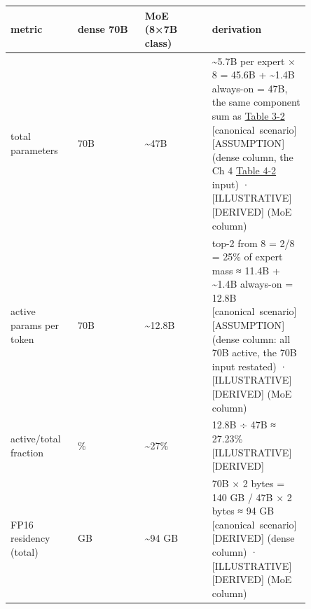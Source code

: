 \nopagebreak[4]
\begin{longtable}[]{@{}
  >{\raggedright\arraybackslash}p{0.2127\linewidth}
  >{\raggedright\arraybackslash}p{0.2127\linewidth}
  >{\raggedright\arraybackslash}p{0.2127\linewidth}
  >{\raggedright\arraybackslash}p{0.2127\linewidth}@{}}
\toprule\noalign{}
\begin{minipage}[b]{\linewidth}\raggedright
metric
\end{minipage} & \begin{minipage}[b]{\linewidth}\raggedright
dense 70B
\end{minipage} & \begin{minipage}[b]{\linewidth}\raggedright
MoE (8×7B class)
\end{minipage} & \begin{minipage}[b]{\linewidth}\raggedright
derivation
\end{minipage} \\
\midrule\noalign{}
\endhead
\bottomrule\noalign{}
\endlastfoot
total parameters & 70B & \textasciitilde47B & \textasciitilde5.7B per
expert × 8 = 45.6B + \textasciitilde1.4B always-on = 47B, the same
component sum as \hyperref[tab:3.2]{Table 3-2} \mbox{{[}canonical scenario{]}}\hspace{0pt}\mbox{{[}ASSUMPTION{]}}
(dense column, the Ch 4 \hyperref[tab:4.2]{Table 4-2} input) ·
\mbox{{[}ILLUSTRATIVE{]}}\hspace{0pt}\mbox{{[}DERIVED{]}} (MoE column) \\
\noalign{\label{tab:3.3}}
active params per token & 70B & \textasciitilde12.8B & top-2 from 8 =
2/8 = 25\% of expert mass ≈ 11.4B + \textasciitilde1.4B always-on =
12.8B \mbox{{[}canonical scenario{]}}\hspace{0pt}\mbox{{[}ASSUMPTION{]}} (dense column: all 70B
active, the 70B input restated) · \mbox{{[}ILLUSTRATIVE{]}}\hspace{0pt}\mbox{{[}DERIVED{]}} (MoE
column) \\
active/total fraction & 100\% & \textasciitilde27\% & 12.8B ÷ 47B ≈
27.23\% \mbox{{[}ILLUSTRATIVE{]}}\hspace{0pt}\mbox{{[}DERIVED{]}} \\
FP16 residency (total) & 140 GB & \textasciitilde94 GB & 70B × 2 bytes =
140 GB / 47B × 2 bytes ≈ 94 GB \mbox{{[}canonical scenario{]}}\hspace{0pt}\mbox{{[}DERIVED{]}}
(dense column) · \mbox{{[}ILLUSTRATIVE{]}}\hspace{0pt}\mbox{{[}DERIVED{]}} (MoE column) \\

\end{longtable}
